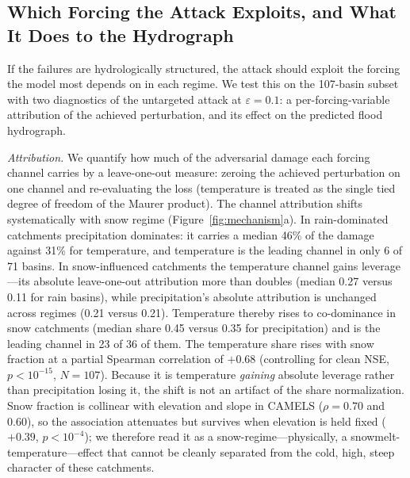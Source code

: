 \documentclass[final]{agujournal2019}
\begin{document}
\subsection{Which Forcing the Attack Exploits, and What It Does to the Hydrograph}
\label{sec:mechanism}

If the failures are hydrologically structured, the attack should exploit the forcing the model most depends on in each regime. We test this on the 107-basin subset with two diagnostics of the untargeted attack at $\varepsilon = 0.1$: a per-forcing-variable attribution of the achieved perturbation, and its effect on the predicted flood hydrograph.

\textit{Attribution.} We quantify how much of the adversarial damage each forcing channel carries by a leave-one-out measure: zeroing the achieved perturbation on one channel and re-evaluating the loss (temperature is treated as the single tied degree of freedom of the Maurer product). The channel attribution shifts systematically with snow regime (Figure~\ref{fig:mechanism}a). In rain-dominated catchments precipitation dominates: it carries a median 46\% of the damage against 31\% for temperature, and temperature is the leading channel in only 6 of 71 basins. In snow-influenced catchments the temperature channel gains leverage---its absolute leave-one-out attribution more than doubles (median 0.27 versus 0.11 for rain basins), while precipitation's absolute attribution is unchanged across regimes (0.21 versus 0.21). Temperature thereby rises to co-dominance in snow catchments (median share 0.45 versus 0.35 for precipitation) and is the leading channel in 23 of 36 of them. The temperature share rises with snow fraction at a partial Spearman correlation of $+0.68$ (controlling for clean NSE, $p < 10^{-15}$, $N = 107$). Because it is temperature \emph{gaining} absolute leverage rather than precipitation losing it, the shift is not an artifact of the share normalization. Snow fraction is collinear with elevation and slope in CAMELS ($\rho = 0.70$ and $0.60$), so the association attenuates but survives when elevation is held fixed ($+0.39$, $p < 10^{-4}$); we therefore read it as a snow-regime---physically, a snowmelt-temperature---effect that cannot be cleanly separated from the cold, high, steep character of these catchments.
\end{document}
